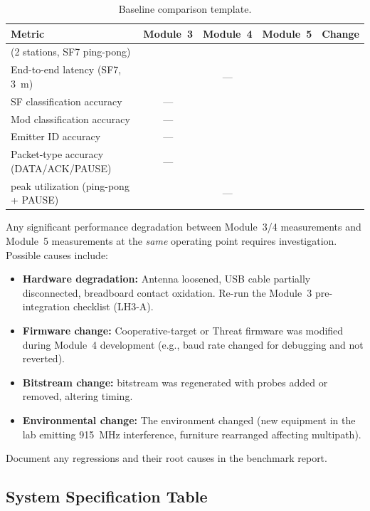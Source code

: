\documentclass[11pt,letterpaper]{article}
\begin{document}
	\begin{table}[ht!]
		\centering
		\caption{Baseline comparison template.}
		\label{tab:baseline_compare}
		\renewcommand{\arraystretch}{1.3}
		\begin{tabularx}{\textwidth}{l c c c X}
			\toprule
			\textbf{Metric} & \textbf{Module~3} & \textbf{Module~4} & \textbf{Module~5} & \textbf{Change} \\
			\midrule
			\PER{} (2 stations, SF7 ping-pong) & & & & \\
			End-to-end latency (SF7, 3~m) & & --- & & \\
			SF classification accuracy & --- & & & \\
			Mod classification accuracy & --- & & & \\
			Emitter ID accuracy & --- & & & \\
			Packet-type accuracy (DATA/ACK/PAUSE) & --- & & & \\
			\FIFO{} peak utilization (ping-pong + PAUSE) & & --- & & \\
			\bottomrule
		\end{tabularx}
	\end{table}

	\begin{tcolorbox}[warning={Regression Detection}]
		Any significant performance degradation between Module~3/4 measurements and Module~5 measurements at the \emph{same} operating point requires investigation. Possible causes include:
		\begin{itemize}
			\item \textbf{Hardware degradation:} Antenna loosened, USB cable partially disconnected, breadboard contact oxidation. Re-run the Module~3 pre-integration checklist (LH3-A).
			\item \textbf{Firmware change:} Cooperative-target or Threat firmware was modified during Module~4 development (e.g., baud rate changed for debugging and not reverted).
			\item \textbf{Bitstream change:} \FPGA{} bitstream was regenerated with \ILA{} probes added or removed, altering timing.
			\item \textbf{Environmental change:} The \RF{} environment changed (new equipment in the lab emitting 915~MHz interference, furniture rearranged affecting multipath).
		\end{itemize}
		Document any regressions and their root causes in the benchmark report.
	\end{tcolorbox}

	\subsection{System Specification Table}
\end{document}
